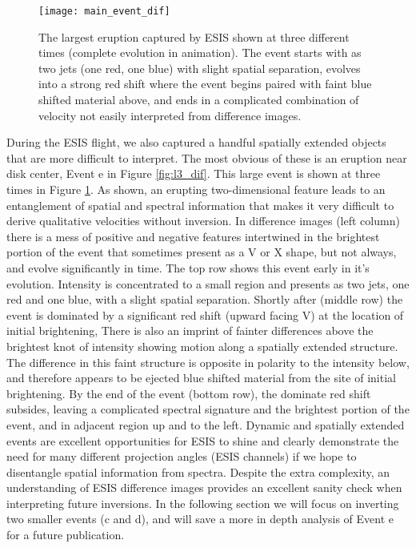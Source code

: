     	
    	\begin{figure}[htb!]
    		\texttt{[image: main\_event\_dif]}
    		\centering
    		\caption{The largest eruption captured by ESIS shown at three different times (complete evolution in animation). The event starts with as two jets (one red, one blue) with slight spatial separation, evolves into a strong red shift where the event begins paired with faint blue shifted material above, and ends in a complicated combination of velocity not easily interpreted from difference images. }
    		\label{fig:main_event}
    	\end{figure}
		
    	During the ESIS flight, we also captured a handful spatially extended objects that are more difficult to interpret.
    	The most obvious of these is an eruption near disk center, Event e in Figure \ref{fig:l3_dif}.
    	This large event is shown at three times in Figure \ref{fig:main_event}.
    	As shown, an erupting two-dimensional feature leads to an entanglement of spatial and spectral information that makes it very difficult to derive qualitative velocities without inversion.
    	In difference images (left column) there is a mess of positive and negative features intertwined in the brightest portion of the event that sometimes present as a V or X shape, but not always, and evolve significantly in time.
    	The top row shows this event early in it's evolution. 
    	Intensity is concentrated to a small region and presents as two jets, one red and one blue, with a slight spatial separation.
    	Shortly after (middle row) the event is dominated by a significant red shift (upward facing V) at the location of initial brightening, 
    	There is also an imprint of fainter differences above the brightest knot of intensity showing motion along a spatially extended structure.
    	The difference in this faint structure is opposite in polarity to the intensity below, and therefore appears to be ejected blue shifted material from the site of initial brightening.
    	By the end of the event (bottom row), the dominate red shift subsides, leaving a complicated spectral signature and the brightest portion of the event, and in adjacent region up and to the left.  
    	Dynamic and spatially extended events are excellent opportunities for ESIS to shine and clearly demonstrate the need for many different projection angles (ESIS channels) if we hope to disentangle spatial information from spectra.
    	Despite the extra complexity, an understanding of ESIS difference images provides an excellent sanity check when interpreting future inversions.
    	In the following section we will focus on inverting two smaller events (c and d), and will save a more in depth analysis of Event e for a future publication. 
    	
